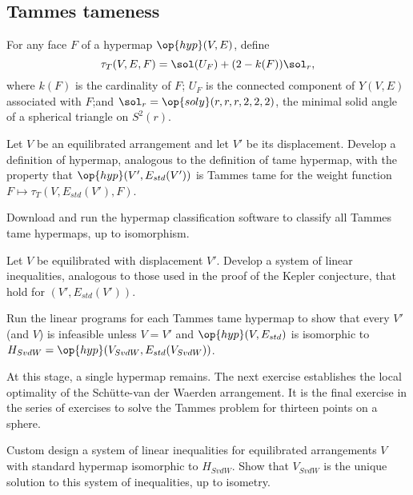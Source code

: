 \subsection{Tammes tameness}

For any face $F$ of a hypermap $\op{hyp}(V,E)$, define
\[
\tau_T(V,E,F) = \sol(U_F) + (2- k(F)) \sol_r,
\]
where $k(F)$ is the cardinality of $F$; $U_F$ is the connected
component of $Y(V,E)$ associated with $F$;and $\sol_r =
\op{soly}(r,r,r,2,2,2)$, the minimal solid angle of a spherical triangle on
$S^2(r)$.

\begin{exer}  
  Let $V$ be an equilibrated arrangement and let $V'$ be its
  displacement.  Develop a definition of 
  hypermap, analogous to the definition of tame hypermap, with the
  property that $\op{hyp}(V',E_{std}(V'))$ is Tammes tame for the
  weight function $F\mapsto \tau_T(V,E_{std}(V'),F)$.
\end{exer}

\begin{exer}  
  Download and run the hypermap classification software to classify all Tammes tame
  hypermaps, up to isomorphism.
\end{exer}

\begin{exer} Let $V$ be equilibrated with displacement $V'$.  Develop
  a system of linear inequalities, analogous to those used in the
  proof of the Kepler conjecture, that hold for $(V',E_{std}(V'))$.  
\end{exer}

\begin{exer}
  Run the linear programs for each Tammes tame hypermap to show that
  every $V'$ (and $V$) is infeasible unless $V=V'$ and
  $\op{hyp}(V,E_{std})$ is isomorphic to
  $H_{SvdW}=\op{hyp}(V_{SvdW},E_{std}(V_{SvdW}))$.
\end{exer}

At this stage, a single hypermap remains.  The next exercise
establishes the local optimality of the Sch\"utte-van der Waerden
arrangement.  It is the final exercise in the series of exercises to
solve the Tammes problem for thirteen points on a sphere.

\begin{exer} 
  Custom design a system of linear inequalities for equilibrated
  arrangements $V$ with standard hypermap  isomorphic to
  $H_{SvdW}$.  Show that $V_{SvdW}$ is the unique solution to this
  system of inequalities, up to isometry.
\end{exer}





